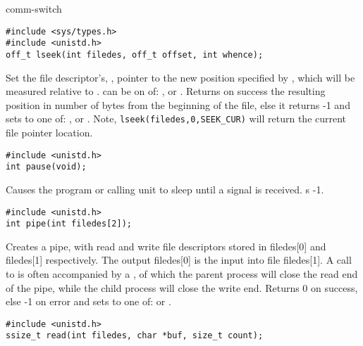 \begin{Ventry2}{comm-switch  }
\item[lseek]
\label{item:lseek}
\begin{production}
\begin{verbatim}
#include <sys/types.h>
#include <unistd.h> 
off_t lseek(int filedes, off_t offset, int whence);
\end{verbatim}
\end{production}

Set the file descriptor's, , pointer to the new position
specified by , which will be measured relative to
.  can be on of:
,  or . Returns on success the 
resulting position in number of bytes from the beginning of the file,
else it returns -1 and sets  to one of: , 
or . Note, \verb+lseek(filedes,0,SEEK_CUR)+ will return
the current file pointer location.

\item[pause]
\label{item:pause}
\begin{production}
\begin{verbatim}
#include <unistd.h>
int pause(void);
\end{verbatim}
\end{production}

Causes the program or calling unit to sleep until a signal is received.
s  -1.

\item[pipe]
\label{item:pipe}
\begin{production}
\begin{verbatim}
#include <unistd.h>
int pipe(int filedes[2]);
\end{verbatim}
\end{production}

Creates a pipe, with read and write file descriptors stored in
filedes[0] and filedes[1] respectively. The output filedes[0] is the
input into file filedes[1]. A call to  is often accompanied by
a , of which the parent process will close the read end of the
pipe, while the child process will close the write end.  Returns 0 on
success, else -1 on error and sets
 to one of:  or .

\item[read]
\label{item:read}
\begin{production}
\begin{verbatim}
#include <unistd.h>
ssize_t read(int filedes, char *buf, size_t count);
\end{verbatim}
\end{production}


\end{Ventry2}
